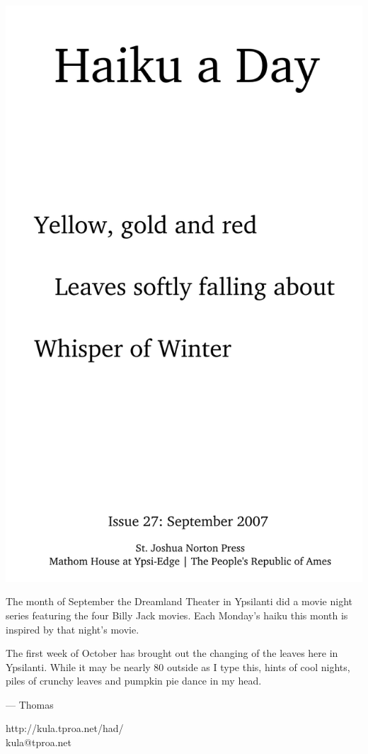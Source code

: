 \documentclass[12pt]{article}
\begin{document}
\includegraphics{frontpage.png}

\newpage

The month of September the Dreamland Theater in Ypsilanti
did a movie night series featuring the four Billy Jack 
movies. Each Monday's haiku this month is inspired by that night's
movie. 

The first week of October has brought out the changing of the
leaves here in Ypsilanti. While it may be nearly 80 outside
as I type this, hints of cool nights, piles of crunchy leaves
and pumpkin pie dance in my head.


--- Thomas

http://kula.tproa.net/had/ \\
kula@tproa.net
\end{document}
